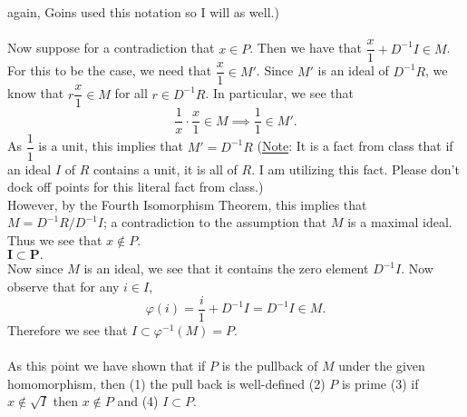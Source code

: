\documentclass[12pt,letterpaper]{algebra_book}
\renewcommand{\phi}{\varphi}
\theoremstyle{definition}
\begin{document}
\begin{prf}
\begin{enumerate}
            again, Goins used this notation so I will as well.)
            \\
            \\
            Now suppose for a contradiction that $x \in P$. Then we have that $\dfrac{x}{1} +
            D^{-1}I \in M$. For this to be the case, we need that $\dfrac{x}{1} \in
            M'$. Since $M'$ is an ideal of $D^{-1}R$, we know that
            $r\dfrac{x}{1} \in M$ for all $r \in D^{-1}R$. In particular, we see that 
            \[
                \dfrac{1}{x} \cdot \dfrac{x}{1} \in M \implies \dfrac{1}{1} \in M'.
            \]
            As $\dfrac{1}{1}$ is a unit, this implies that $M' = D^{-1}R$
            (\underline{Note}: It is a fact from class that if an ideal
            $I$ of $R$ contains a unit, it is all of $R$. I am utilizing
            this fact. Please don't dock off points for this literal fact
            from class.)
            \\
            However, by the Fourth Isomorphism Theorem, this implies that
            $M = D^{-1}R/D^{-1}I$; a contradiction to the assumption that
            $M$ is a maximal ideal. Thus we see that $x \not\in P$. 
            \\[1.2ex]
            \underline{$\bm{I \subset P}.$}\\[1.2ex]
            Now since $M$ is an ideal, we see that it contains the zero
            element $D^{-1}I$. Now observe that for any $i \in I$,
            \[
                \phi(i) = \dfrac{i}{1} + D^{-1}I = D^{-1}I \in M.
            \]
            Therefore we see that $I \subset \phi^{-1}(M) = P$.
            \\
            \\
            As this point we have shown that if $P$ is the pullback of $M$
            under the given homomorphism, then (1) the pull back is well-defined (2) $P$ is prime (3) if $x
            \not\in \sqrt{I}$ then $x \not\in P$ and (4) $I \subset P$.
            

\end{enumerate}
\end{prf}
\end{document}
